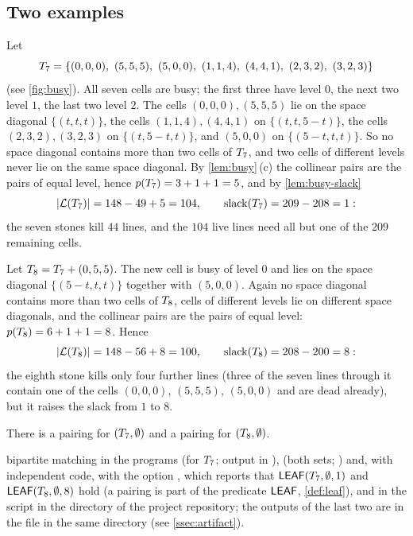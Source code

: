 \subsection{Two examples}\label{ssec:examples}

\begin{example}\label{ex:T7}
Let
\[
  \Tseven=\{(0,0,0),\ (5,5,5),\ (5,0,0),\ (1,1,4),\ (4,4,1),\ (2,3,2),\ (3,2,3)\}
\]
(see \cref{fig:busy}). All seven cells are busy; the first three have level $0$, the next two level
$1$, the last two level $2$. The cells $(0,0,0),(5,5,5)$ lie on the space diagonal $\{(t,t,t)\}$, the
cells $(1,1,4),(4,4,1)$ on $\{(t,t,5-t)\}$, the cells $(2,3,2),(3,2,3)$ on $\{(t,5-t,t)\}$, and $(5,0,0)$ on
$\{(5-t,t,t)\}$. So no space diagonal contains more than two cells of $T_7$, and two cells of
different levels never lie on the same space diagonal. By \cref{lem:busy}\,(c) the collinear pairs are
the pairs of equal level, hence $p(T_7)=3+1+1=5$, and by \cref{lem:busy-slack}
\[
  |\mathcal{L}(T_7)|=148-49+5=104,\qquad \operatorname{slack}(T_7)=209-208=1 :
\]
the seven stones kill $44$ lines, and the $104$ live lines need all but one of the $209$ remaining cells.
\end{example}

\begin{example}\label{ex:T8}
Let $T_8=T_7+(0,5,5)$. The new cell is busy of level $0$ and lies on the space diagonal
$\{(5-t,t,t)\}$ together with $(5,0,0)$. Again no space diagonal contains more than two cells of
$T_8$, cells of different levels lie on different space diagonals, and the collinear pairs are the
pairs of equal level: $p(T_8)=6+1+1=8$. Hence
\[
  |\mathcal{L}(T_8)|=148-56+8=100,\qquad \operatorname{slack}(T_8)=208-200=8 :
\]
the eighth stone kills only four further lines (three of the seven lines through it contain one of the
cells $(0,0,0)$, $(5,5,5)$, $(5,0,0)$ and are dead already), but it raises the slack from $1$ to $8$.
\end{example}

\begin{fact}\label{fact:T-pairings}
There is a pairing for $(T_7,\emptyset)$ and a pairing for $(T_8,\emptyset)$.

\established bipartite matching in the programs  (for $T_7$; output in
),  (both sets; ) and,
with independent code,  with the option , which reports that $\mathsf{LEAF}(T_7,\emptyset,1)$
and $\mathsf{LEAF}(T_8,\emptyset,8)$ hold (a pairing is part of the predicate $\mathsf{LEAF}$, \cref{def:leaf}), and
in the script  in the directory  of the project repository; the
outputs of the last two are in the file  in the same directory (see
\cref{ssec:artifact}).
\end{fact}

